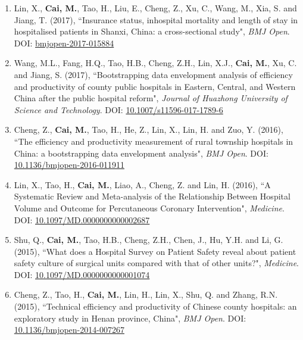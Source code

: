 \documentclass[11pt, a4paper]{article}
\newcommand{\years}[1]{\marginnote{\scriptsize #1}}
\begin{document}
\begin{enumerate}[leftmargin=0ex,itemsep=1ex]
		\item Lin, X., \textbf{Cai, M.}, Tao, H., Liu, E., Cheng, Z., Xu, C., Wang, M., Xia, S. and Jiang, T. (2017), ``Insurance status, inhospital mortality and length of stay in hospitalised patients in Shanxi, China: a cross-sectional study", \emph{BMJ Open}. DOI: \href{https://doi.org/10.1136/bmjopen-2017-015884}{bmjopen-2017-015884}
		
		\item Wang, M.L., Fang, H.Q., Tao, H.B., Cheng, Z.H., Lin, X.J., \textbf{Cai, M.}, Xu, C. and Jiang, S. (2017), ``Bootstrapping data envelopment analysis of efficiency and productivity of county public hospitals in Eastern, Central, and Western China after the public hospital reform", \emph{Journal of Huazhong University of Science and Technology}. DOI: \href{https://doi.org/10.1007/s11596-017-1789-6}{10.1007/s11596-017-1789-6}
		
		
		\item \years{2016}Cheng, Z., \textbf{Cai, M.}, Tao, H., He, Z., Lin, X., Lin, H. and Zuo, Y. (2016), ``The efficiency and productivity measurement of rural township hospitals in China: a bootstrapping data envelopment analysis", \emph{BMJ Open}. DOI: \href{https://doi.org/10.1136/bmjopen-2016-011911}{10.1136/bmjopen-2016-011911}
		
		\item Lin, X., Tao, H., \textbf{Cai, M.}, Liao, A., Cheng, Z. and Lin, H. (2016), ``A Systematic Review and Meta-analysis of the Relationship Between Hospital Volume and Outcome for Percutaneous Coronary Intervention", \emph{Medicine}. DOI: \href{https://doi.org/10.1097/MD.0000000000002687}{10.1097/MD.0000000000002687}
		
		
		\item \years{2015}Shu, Q., \textbf{Cai, M.}, Tao, H.B., Cheng, Z.H., Chen, J., Hu, Y.H. and Li, G. (2015), ``What does a Hospital Survey on Patient Safety reveal about patient safety culture of surgical units compared with that of other units?", \emph{Medicine}. DOI: \href{https://doi.org/10.1097/MD.0000000000001074}{10.1097/MD.0000000000001074}
		
		\item Cheng, Z., Tao, H., \textbf{Cai, M.}, Lin, H., Lin, X., Shu, Q. and Zhang, R.N. (2015), ``Technical efficiency and productivity of Chinese county hospitals: an exploratory study in Henan province, China", \emph{BMJ Open}. DOI: \href{https://doi.org/10.1136/bmjopen-2014-007267}{10.1136/bmjopen-2014-007267}
	\end{enumerate}
	
\end{document}
